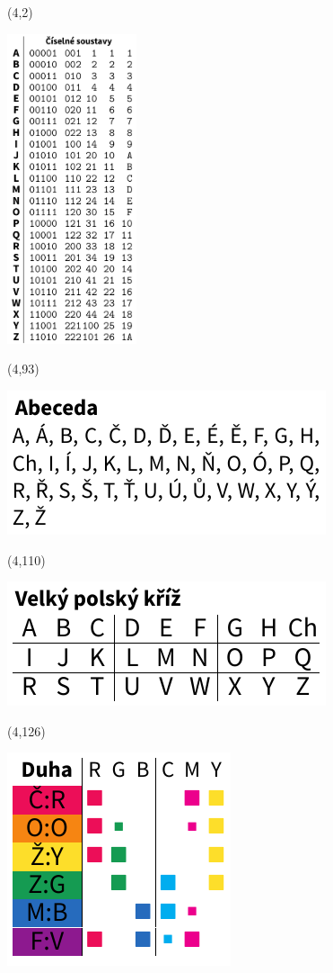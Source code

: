 \documentclass{extarticle}
\begin{document}
\pagecolor{sand}
\pagestyle{empty}

\begin{textblock}{38}(4,2)
\vfill
{\centerline{\includegraphics[width=38mm]{tools/numbers-table-v3.pdf}}} 
\vfill
\end{textblock}


\begin{textblock}{38}(4,93)
\vfill
{\centerline{\includegraphics[scale=0.6333]{tools/alphabet.pdf}}} 
\vfill
\end{textblock}

\begin{textblock}{38}(4,110)
\vfill
{\centerline{\includegraphics[scale=0.6333]{tools/rosicrucian-polish.pdf}}} 
\vfill
\end{textblock}

\begin{textblock}{26.6}(4,126)
\vfill
{\centerline{\includegraphics[scale=0.6333]{tools/rainbow-v2.pdf}}} 
\vfill
\end{textblock}
\end{document}
